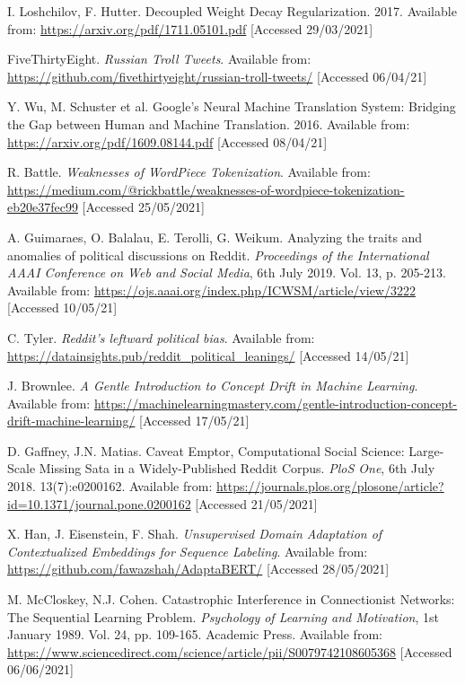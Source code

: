 \begin{thebibliography}{9}
I. Loshchilov, F. Hutter. Decoupled Weight Decay Regularization. 2017. Available from: \url{https://arxiv.org/pdf/1711.05101.pdf} [Accessed 29/03/2021]

FiveThirtyEight. \textit{Russian Troll Tweets}. Available from: \url{https://github.com/fivethirtyeight/russian-troll-tweets/} [Accessed 06/04/21]

Y. Wu, M. Schuster et al. Google's Neural Machine Translation System: Bridging the Gap between Human and Machine Translation. 2016. Available from: \url{https://arxiv.org/pdf/1609.08144.pdf} [Accessed 08/04/21]

R. Battle. \textit{Weaknesses of WordPiece Tokenization}. Available from: \url{https://medium.com/@rickbattle/weaknesses-of-wordpiece-tokenization-eb20e37fec99} [Accessed 25/05/2021]

A. Guimaraes, O. Balalau, E. Terolli, G. Weikum. Analyzing the traits and anomalies of political discussions on Reddit. \textit{Proceedings of the International AAAI Conference on Web and Social Media}, 6th July 2019. Vol. 13, p. 205-213. Available from: \url{https://ojs.aaai.org/index.php/ICWSM/article/view/3222} [Accessed 10/05/21]

C. Tyler. \textit{Reddit's leftward political bias}. Available from: \url{https://datainsights.pub/reddit_political_leanings/} [Accessed 14/05/21]

J. Brownlee. \textit{A Gentle Introduction to Concept Drift in Machine Learning}. Available from: \url{https://machinelearningmastery.com/gentle-introduction-concept-drift-machine-learning/} [Accessed 17/05/21]

D. Gaffney, J.N. Matias. Caveat Emptor, Computational Social Science: Large-Scale Missing Sata in a Widely-Published Reddit Corpus. \textit{PloS One}, 6th July 2018. 13(7):e0200162. Available from: \url{https://journals.plos.org/plosone/article?id=10.1371/journal.pone.0200162} [Accessed 21/05/2021]

X. Han, J. Eisenstein, F. Shah. \textit{Unsupervised Domain Adaptation of Contextualized Embeddings for Sequence Labeling}. Available from: \url{https://github.com/fawazshah/AdaptaBERT/} [Accessed 28/05/2021]

M. McCloskey, N.J. Cohen. Catastrophic Interference in Connectionist Networks: The Sequential Learning Problem. \textit{Psychology of Learning and Motivation}, 1st January 1989. Vol. 24, pp. 109-165. Academic Press. Available from: \url{https://www.sciencedirect.com/science/article/pii/S0079742108605368} [Accessed 06/06/2021]


\end{thebibliography}
